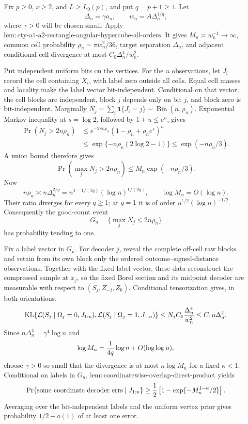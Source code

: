 Fix \(p\geq0\), \(\nu\geq2\), and \(L\geq L_0(p)\), and put \(q=p+1\geq1\).  Let
\[
 \Delta_n=\gamma a_n,
 \qquad w_n=A\Delta_n^{1/q},
\]
where \(\gamma>0\) will be chosen small.  Apply \(\mathrm{lem:cty\text{-}a1\text{-}a2\text{-}rectangle\text{-}angular\text{-}hypercube\text{-}all\text{-}orders}\).  It gives \(M_n\asymp w_n^{-1}\to\infty\), common cell probability \(\rho_n=\pi w_n^2/36\), target separation \(\Delta_n\), and adjacent conditional cell divergence at most \(C_0\Delta_n^4/w_n^2\).

Put independent uniform bits on the vertices.  For the \(n\) observations, let \(J_i\) record the cell containing \(X_i\), with label zero outside all cells.  Equal cell masses and locality make the label vector bit-independent.  Conditional on that vector, the cell blocks are independent, block \(j\) depends only on bit \(j\), and block zero is bit-independent.  Marginally \(N_j=\sum_i\mathbf1\{J_i=j\}\sim\operatorname{Bin}(n,\rho_n)\).  Exponential Markov inequality at \(s=\log2\), followed by \(1+u\leq e^u\), gives
\[
\begin{split}
 \Pr(N_j>2n\rho_n)
 &\leq e^{-2sn\rho_n}(1-\rho_n+\rho_ne^s)^n\\
 &\leq\exp\{-n\rho_n(2\log2-1)\}
 \leq\exp(-n\rho_n/3).
\end{split}
\]
A union bound therefore gives
\[
 \Pr\!\left(\max_jN_j>2n\rho_n\right)
 \leq M_n\exp(-n\rho_n/3).
\]
Now
\[
 n\rho_n\asymp n\Delta_n^{2/q}
 =n^{1-1/(2q)}(\log n)^{1/(2q)},
 \qquad \log M_n=O(\log n).
\]
Their ratio diverges for every \(q\geq1\); at \(q=1\) it is of order \(n^{1/2}(\log n)^{-1/2}\).  Consequently the good-count event
\[
 G_n=\{\max_jN_j\leq2n\rho_n\}
\]
has probability tending to one.

Fix a label vector in \(G_n\).  For decoder \(j\), reveal the complete off-cell raw blocks and retain from its own block only the ordered outcome--signed-distance observations.  Together with the fixed label vector, these data reconstruct the compressed sample at \(x_j\), so the fixed Borel section and its midpoint decoder are measurable with respect to \((S_j,Z_{-j},Z_0)\).  Conditional tensorization gives, in both orientations,
\[
 \operatorname{KL}\{\mathcal L(S_j\mid\Omega_j=0,J_{1:n}),
 \mathcal L(S_j\mid\Omega_j=1,J_{1:n})\}
 \leq N_jC_0{\Delta_n^4\over w_n^2}
 \leq C_1n\Delta_n^4.
\]
Since \(n\Delta_n^4=\gamma^4\log n\) and
\[
 \log M_n={1\over4q}\log n+O(\log\log n),
\]
choose \(\gamma>0\) so small that the divergence is at most \(\kappa\log M_n\) for a fixed \(\kappa<1\).  Conditional on labels in \(G_n\), \(\mathrm{lem:coordinatewise\text{-}overlap\text{-}direct\text{-}product}\) yields
\[
 \Pr\{\text{some coordinate decoder errs}\mid J_{1:n}\}
 \geq {1\over2}\left[1-\exp\{-M_n^{1-\kappa}/2\}\right].
\]
Averaging over the bit-independent labels and the uniform vertex prior gives probability \(1/2-o(1)\) of at least one error.

